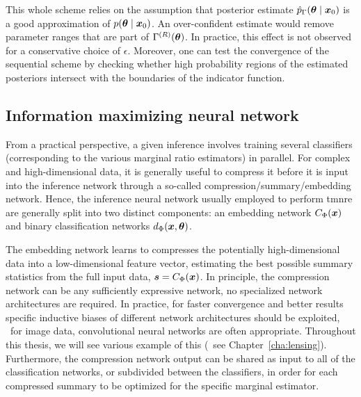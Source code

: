 
This whole scheme relies on the assumption that posterior estimate $\hat p_{\Gamma}(\bm{\theta} \mid \bm{x}_0)$ is a good approximation of $p(\bm{\theta} \mid \bm{x}_0)$. An over-confident estimate would remove parameter ranges that are part of $\Gamma^{(R)}(\bm{\theta})$. In practice, this effect is not observed for a conservative choice of $\epsilon$. Moreover, one can test the convergence of the sequential scheme by checking whether high probability regions of the estimated posteriors intersect with the boundaries of the indicator function.


\subsection{Information maximizing neural network} \label{subsec:tmnre-nn}

From a practical perspective, a given inference involves training several classifiers (corresponding to the various marginal ratio estimators) in parallel. For complex and high-dimensional data, it is generally useful to compress it before it is input into the inference network through a so-called compression/summary/embedding network. Hence, the inference neural network usually employed to perform \gls*{tmnre} are generally split into two distinct components: an embedding network $C_\Phi(\bm{x})$ and binary classification networks $d_\Phi(\bm{x}, \bm{\theta})$. 

The embedding network learns to compresses the potentially high-dimensional data into a low-dimensional feature vector, estimating the best possible summary statistics from the full input data, $\boldsymbol{s}= C_\Phi(\bm{x})$. In principle, the compression network can be any sufficiently expressive network, no specialized network architectures are required. In practice, for faster convergence and better results specific inductive biases of different network architectures should be exploited, \eg~for image data, convolutional neural networks are often appropriate. Throughout this thesis, we will see various example of this (\eg~see Chapter~\ref{cha:lensing}). Furthermore, the compression network output can be shared as input to all of the classification networks, or subdivided between the classifiers, in order for each compressed summary to be optimized for the specific marginal estimator. 

